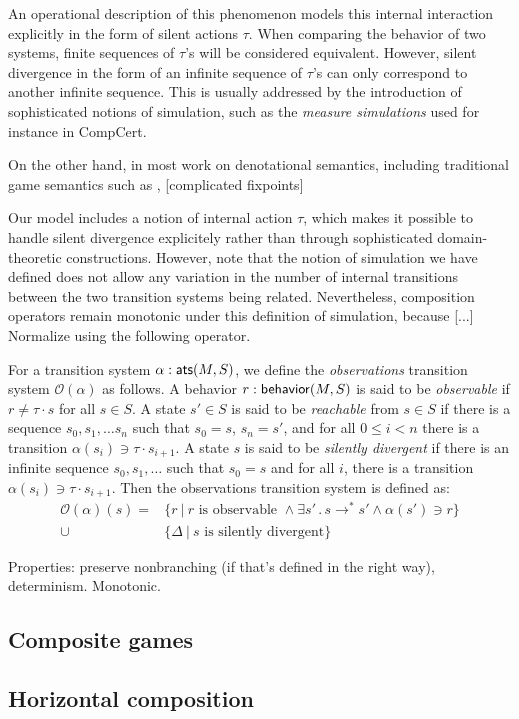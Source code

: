 An operational description of this phenomenon
models this internal interaction explicitly
in the form of silent actions $\tau$.
When comparing the behavior of two systems,
finite sequences of $\tau$'s will be considered equivalent.
However,
silent divergence in the form of an infinite sequence of $\tau$'s
can only correspond to another infinite sequence.
This is usually addressed by the introduction of
sophisticated notions of simulation,
such as the \emph{measure simulations} used for instance in CompCert.

On the other hand,
in most work on denotational semantics,
including traditional game semantics such as \cite{pcfgs},
[complicated fixpoints] 

Our model includes a notion of internal action $\tau$,
which makes it possible to handle silent divergence explicitely
rather than through sophisticated domain-theoretic constructions.
However,
note that the notion of simulation we have defined
does not allow any variation
in the number of internal transitions
between the two transition systems being related.
Nevertheless,
composition operators remain monotonic
under this definition of simulation,
because [...]
Normalize using the following operator.

\begin{definition}
For a transition system $\alpha :  \mathsf{ats} (M, S)$,
we define the \emph{observations} transition system
$\mathcal{O}(\alpha)$ as follows.
A behavior $r :  \mathsf{behavior} (M, S)$ is said to be
\emph{observable} if $r \ne \tau \cdot s$ for all $s \in S$.
A state $s' \in S$ is said to be \emph{reachable} from $s \in S$
if there is a sequence $s_0, s_1, \ldots s_n$ such that
$s_0 = s$, $s_n = s'$,
and for all $0 \le i < n$
there is a transition $\alpha(s_i) \ni \tau \cdot s_{i+1}$.
A state $s$ is said to be \emph{silently divergent}
if there is an infinite sequence $s_0, s_1, \ldots$
such that $s_0 = s$ and for all $i$,
there is a transition $\alpha(s_i) \ni \tau \cdot s_{i+1}$.
Then the observations transition system is defined as:
\begin{align*}
    \mathcal{O}(\alpha)(s) = &\{ r \:|\: r \mbox{ is observable } \wedge
         \exists s' \,.\, s \rightarrow^* s' \wedge
		\alpha(s') \ni r \} \\
      \cup &\{ \Delta \:|\: s \mbox{ is silently divergent} \}
\end{align*}
\end{definition}

Properties:
preserve nonbranching (if that's defined in the right way), determinism.
Monotonic.

\subsection{Composite games}




\subsection{Horizontal composition}





